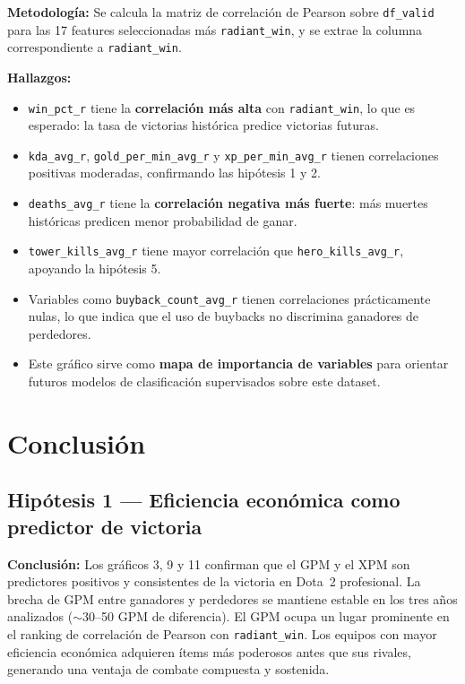 \documentclass[12pt,a4paper]{article}
\begin{document}
\textbf{Metodolog\'ia:} Se calcula la matriz de correlaci\'on de Pearson sobre
\texttt{df\_valid} para las 17 features seleccionadas m\'as \texttt{radiant\_win},
y se extrae la columna correspondiente a \texttt{radiant\_win}.

\textbf{Hallazgos:}
\begin{itemize}
  \item \texttt{win\_pct\_r} tiene la \textbf{correlaci\'on m\'as alta} con
        \texttt{radiant\_win}, lo que es esperado: la tasa de victorias hist\'orica
        predice victorias futuras.
  \item \texttt{kda\_avg\_r}, \texttt{gold\_per\_min\_avg\_r} y
        \texttt{xp\_per\_min\_avg\_r} tienen correlaciones positivas moderadas,
        confirmando las hip\'otesis 1 y 2.
  \item \texttt{deaths\_avg\_r} tiene la \textbf{correlaci\'on negativa m\'as
        fuerte}: m\'as muertes hist\'oricas predicen menor probabilidad de ganar.
  \item \texttt{tower\_kills\_avg\_r} tiene mayor correlaci\'on que
        \texttt{hero\_kills\_avg\_r}, apoyando la hip\'otesis 5.
  \item Variables como \texttt{buyback\_count\_avg\_r} tienen correlaciones
        pr\'acticamente nulas, lo que indica que el uso de buybacks no discrimina
        ganadores de perdedores.
  \item Este gr\'afico sirve como \textbf{mapa de importancia de variables} para
        orientar futuros modelos de clasificaci\'on supervisados sobre este dataset.
\end{itemize}

\section{Conclusi\'on}

\subsection*{Hip\'otesis 1 --- Eficiencia econ\'omica como predictor de victoria}

\textbf{Conclusi\'on:} Los gr\'aficos 3, 9 y 11 confirman que el GPM y el XPM son
predictores positivos y consistentes de la victoria en Dota~2 profesional. La
brecha de GPM entre ganadores y perdedores se mantiene estable en los tres a\~nos
analizados ($\sim$30--50 GPM de diferencia). El GPM ocupa un lugar prominente en
el ranking de correlaci\'on de Pearson con \texttt{radiant\_win}. Los equipos con
mayor eficiencia econ\'omica adquieren \'items m\'as poderosos antes que sus
rivales, generando una ventaja de combate compuesta y sostenida.
\end{document}
